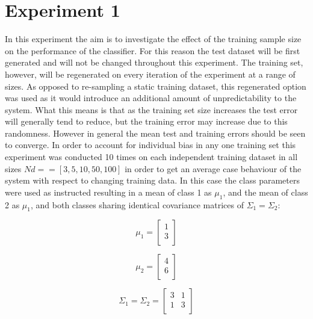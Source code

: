 \section{Experiment 1}
In this experiment the aim is to investigate the effect of the training sample size on the performance of the classifier. For this reason the test dataset will be first generated and will not be changed throughout this experiment. The training set, however, will be regenerated on every iteration of the experiment at a range of sizes. As opposed to re-sampling a static training dataset, this regenerated option was used as it would introduce an additional amount of unpredictability to the system. What this means is that as the training set size increases the test error will generally tend to reduce, but the training error  may increase due to this randomness. However in general the mean test and training errors should be seen to converge. In order to account for individual bias in any one training set this experiment was conducted 10 times on each independent training dataset in all sizes $Nd = = [3,5,10,50,100]$ in order to get an average case behaviour of the system with respect to changing training data. In this case the class parameters were used  as instructed resulting in a mean of class 1 as $\mu_{1}$, and the mean of class 2 as $\mu_{1}$, and both classes sharing identical covariance matrices of $\Sigma_{1} = \Sigma_{2}$:

\begin{equation*}
	\mu_{1} =  
	\begin{bmatrix} 
   		1 \\
  		3 \\
	\end{bmatrix}
\end{equation*}

\begin{equation*} 
	\mu_{2} =  
	\begin{bmatrix} 
   		4 \\
  		6 \\
	\end{bmatrix}
\end{equation*}

\begin{equation*}
	\Sigma_{1} = \Sigma_{2} = 
	\begin{bmatrix} 
   		3 & 1  \\
  		1 & 3 \\
	\end{bmatrix}
\end{equation*}

